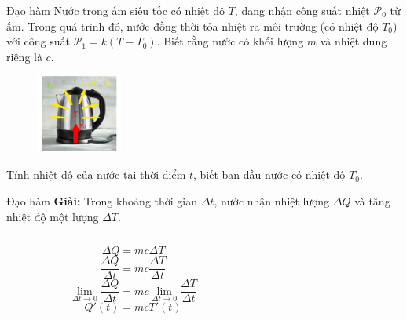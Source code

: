 \begin{frame}{Đạo hàm}
Nước trong ấm siêu tốc có nhiệt độ \(T\), đang nhận công suất nhiệt \(\mathcal{P}_0\) từ ấm. Trong quá trình đó, nước đồng thời tỏa nhiệt ra môi trường (có nhiệt độ \(T_0\)) với công suất \(\mathcal{P}_1=k(T-T_0)\). Biết rằng nước có khối lượng \(m\) và nhiệt dung riêng là \(c\).
\begin{figure}
    \centering
    \includegraphics[width=0.25\textwidth]{Slides/figure/dunnuoc.png}
\end{figure}
Tính nhiệt độ của nước tại thời điểm \(t\), biết ban đầu nước có nhiệt độ \(T_0\).
\end{frame}
\begin{frame}{Đạo hàm}
\textbf{Giải:} Trong khoảng thời gian \(\Delta t\), nước nhận nhiệt lượng \(\Delta Q\) và tăng nhiệt độ một lượng \(\Delta T\).
\begin{columns}
    \begin{column}{0.5\textwidth}
\begin{equation}
\Delta Q=mc\Delta T
\end{equation}
\begin{equation}
\dfrac{\Delta Q}{\Delta t}=mc\dfrac{\Delta T}{\Delta t}
\end{equation}
\begin{equation}
\lim_{\Delta t\to 0}\dfrac{\Delta Q}{\Delta t}=mc\lim_{\Delta t\to 0}\dfrac{\Delta T}{\Delta t}
\end{equation}
\begin{equation}
    Q'(t)=mcT'(t)
\end{equation}
    \end{column}
    \begin{column}{0.5\textwidth}
    \end{column}
    \end{columns}
\end{frame}

